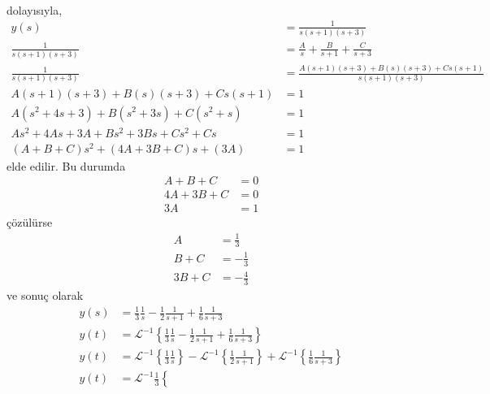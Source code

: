 \begin{enumerate}
\begin{equation}
\begin{split}
        \end{split}
    \end{equation}
    dolayısıyla,
    \begin{equation}
        \begin{split}
            y(s)&=\frac{1}{s(s+1)(s+3)}\\
            \frac{1}{s(s+1)(s+3)}&=\frac{A}{s}+\frac{B}{s+1}+\frac{C}{s+3}\\
            \frac{1}{s(s+1)(s+3)}&=\frac{A(s+1)(s+3)+B(s)(s+3)+Cs(s+1)}{s(s+1)(s+3)}\\
            A(s+1)(s+3)+B(s)(s+3)+Cs(s+1)&=1\\
            A(s^2+4s+3)+B(s^2+3s)+C(s^2+s)&=1\\
            As^2+4As+3A+Bs^2+3Bs+Cs^2+Cs&=1\\
            (A+B+C)s^2+(4A+3B+C)s+(3A)&=1
        \end{split}
        \end{equation}
        elde edilir. Bu durumda 
    \begin{equation}
    \begin{split}
        A+B+C&=0\\
        4A+3B+C&=0\\
        3A&=1
    \end{split}
    \end{equation}
    çözülürse 
    \begin{equation}
        \begin{split}
            A&=\frac{1}{3}\\
            B+C&=-\frac{1}{3}\\
            3B+C&=-\frac{4}{3}
        \end{split}
    \end{equation}
    ve sonuç olarak 
    \begin{equation}
        \begin{split}
            y(s)&=\frac{1}{3}\frac{1}{s}-\frac{1}{2}\frac{1}{s+1}+\frac{1}{6}\frac{1}{s+3}\\
            y(t)&=\mathcal{L}^{-1}\left\{
                \frac{1}{3}\frac{1}{s}-\frac{1}{2}\frac{1}{s+1}+\frac{1}{6}\frac{1}{s+3}\right\}\\
            y(t)&=\mathcal{L}^{-1}\left\{
                \frac{1}{3}\frac{1}{s}\right\}
                -\mathcal{L}^{-1}\left\{\frac{1}{2}\frac{1}{s+1}\right\}
                +\mathcal{L}^{-1}\left\{\frac{1}{6}\frac{1}{s+3}
            \right\}\\
            y(t)&=\mathcal{L}^{-1}\frac{1}{3}\left\{

\end{split}
\end{equation}
\end{enumerate}
